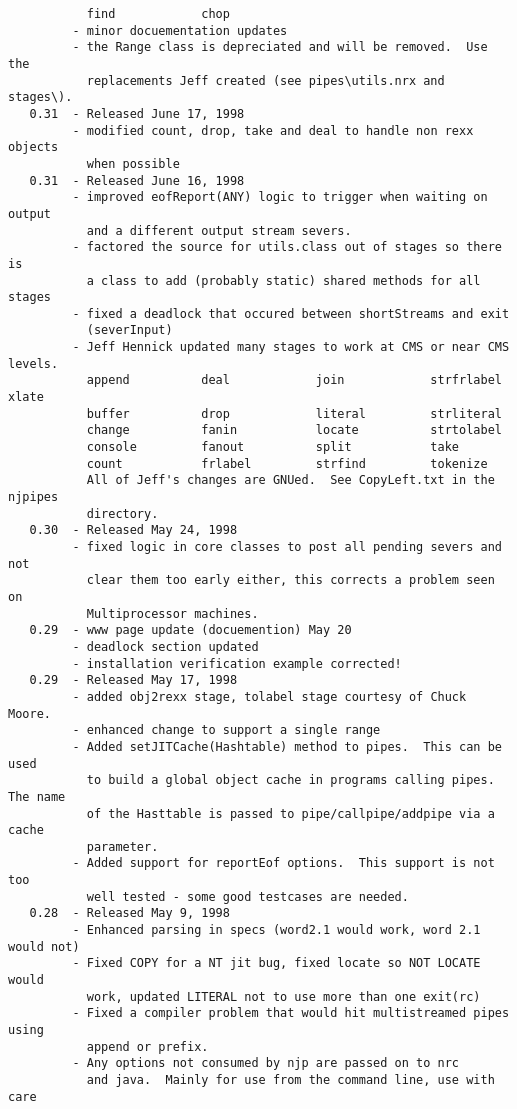 \begin{verbatim}
           find            chop
         - minor docuementation updates
         - the Range class is depreciated and will be removed.  Use the
           replacements Jeff created (see pipes\utils.nrx and stages\).
   0.31  - Released June 17, 1998
         - modified count, drop, take and deal to handle non rexx objects
           when possible
   0.31  - Released June 16, 1998
         - improved eofReport(ANY) logic to trigger when waiting on output
           and a different output stream severs.
         - factored the source for utils.class out of stages so there is
           a class to add (probably static) shared methods for all stages
         - fixed a deadlock that occured between shortStreams and exit
           (severInput)
         - Jeff Hennick updated many stages to work at CMS or near CMS levels.
           append          deal            join            strfrlabel      xlate
           buffer          drop            literal         strliteral
           change          fanin           locate          strtolabel
           console         fanout          split           take
           count           frlabel         strfind         tokenize
           All of Jeff's changes are GNUed.  See CopyLeft.txt in the njpipes
           directory.
   0.30  - Released May 24, 1998
         - fixed logic in core classes to post all pending severs and not
           clear them too early either, this corrects a problem seen on
           Multiprocessor machines.
   0.29  - www page update (docuemention) May 20
         - deadlock section updated
         - installation verification example corrected!
   0.29  - Released May 17, 1998
         - added obj2rexx stage, tolabel stage courtesy of Chuck Moore.
         - enhanced change to support a single range
         - Added setJITCache(Hashtable) method to pipes.  This can be used
           to build a global object cache in programs calling pipes.  The name
           of the Hasttable is passed to pipe/callpipe/addpipe via a cache
           parameter.
         - Added support for reportEof options.  This support is not too
           well tested - some good testcases are needed.
   0.28  - Released May 9, 1998
         - Enhanced parsing in specs (word2.1 would work, word 2.1 would not)
         - Fixed COPY for a NT jit bug, fixed locate so NOT LOCATE would
           work, updated LITERAL not to use more than one exit(rc)
         - Fixed a compiler problem that would hit multistreamed pipes using
           append or prefix.
         - Any options not consumed by njp are passed on to nrc
           and java.  Mainly for use from the command line, use with care

\end{verbatim}
